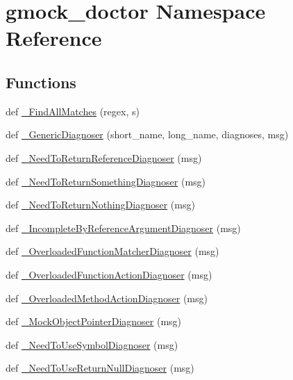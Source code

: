 \hypertarget{namespacegmock__doctor}{}\section{gmock\+\_\+doctor Namespace Reference}
\label{namespacegmock__doctor}
\subsection*{Functions}
\begin{DoxyCompactItemize}
\item 
def \hyperlink{namespacegmock__doctor_af9f6b7d876afcfe52864f2b928f5e6ab}{\+\_\+\+Find\+All\+Matches} (regex, s)
\item 
def \hyperlink{namespacegmock__doctor_af5023d3e12d1f4a7171c6b035783de84}{\+\_\+\+Generic\+Diagnoser} (short\+\_\+name, long\+\_\+name, diagnoses, msg)
\item 
def \hyperlink{namespacegmock__doctor_aa922367471c9e517f839f98e0e3b0a1c}{\+\_\+\+Need\+To\+Return\+Reference\+Diagnoser} (msg)
\item 
def \hyperlink{namespacegmock__doctor_a1dc705b817ae15dbf51ebce10e47ed3f}{\+\_\+\+Need\+To\+Return\+Something\+Diagnoser} (msg)
\item 
def \hyperlink{namespacegmock__doctor_a1d30848b5afc8437c05c03f9d4878a0d}{\+\_\+\+Need\+To\+Return\+Nothing\+Diagnoser} (msg)
\item 
def \hyperlink{namespacegmock__doctor_a57b4c1486c344bd12e4138c588029c19}{\+\_\+\+Incomplete\+By\+Reference\+Argument\+Diagnoser} (msg)
\item 
def \hyperlink{namespacegmock__doctor_a82934d9b43f75ab1112a9436c1a31068}{\+\_\+\+Overloaded\+Function\+Matcher\+Diagnoser} (msg)
\item 
def \hyperlink{namespacegmock__doctor_a385cf8cf2ca6731bf66d721e2dbf89d1}{\+\_\+\+Overloaded\+Function\+Action\+Diagnoser} (msg)
\item 
def \hyperlink{namespacegmock__doctor_a830bf3bac2d58666d82a75dfa0865c42}{\+\_\+\+Overloaded\+Method\+Action\+Diagnoser} (msg)
\item 
def \hyperlink{namespacegmock__doctor_a91e21533e0bc183c40f5a9873158a94b}{\+\_\+\+Mock\+Object\+Pointer\+Diagnoser} (msg)
\item 
def \hyperlink{namespacegmock__doctor_a9ee9925aa81453f121d44e0ad8f1bbaf}{\+\_\+\+Need\+To\+Use\+Symbol\+Diagnoser} (msg)
\item 
def \hyperlink{namespacegmock__doctor_af4268f4fc3c0e612231b6a5d53e9e578}{\+\_\+\+Need\+To\+Use\+Return\+Null\+Diagnoser} (msg)

\end{DoxyCompactItemize}

